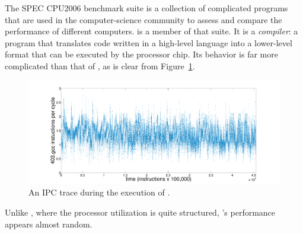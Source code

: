 % 
%   

The SPEC CPU2006 benchmark suite \cite{spec} is a collection of
complicated programs that are used in the computer-science community
to assess and compare the performance of different computers.  \gcc is
a member of that suite.
% 
% 
It is a \emph{compiler}: a program that translates code written in a
high-level language 
into a lower-level format that can be executed by the processor chip.
Its behavior is far more complicated than that of \col, as is clear
from Figure~\ref{fig:gcc-ts}.
  \begin{figure}[t]
  \centering
    \includegraphics[width=\columnwidth]{figs/gccfullts}
    \caption{An IPC trace during the execution of \gcc.}
    \label{fig:gcc-ts}
  \end{figure}
Unlike \col, where the processor utilization is quite structured,
\gcc's performance appears almost random.

